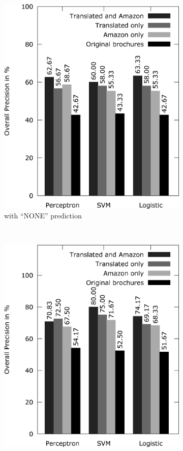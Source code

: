 \begin{figure}[h!]
	\centering
	\begin{subfigure}[t]{0.5\textwidth}
		\includegraphics[width=\textwidth]{figures/product_translate_amazon_with_none.eps}
		\caption{with ``NONE'' prediction}
	\end{subfigure}~
	\begin{subfigure}[t]{0.5\textwidth}
		\includegraphics[width=\textwidth]{figures/product_translate_amazon_without_none.eps}

\end{subfigure}
\end{figure}
